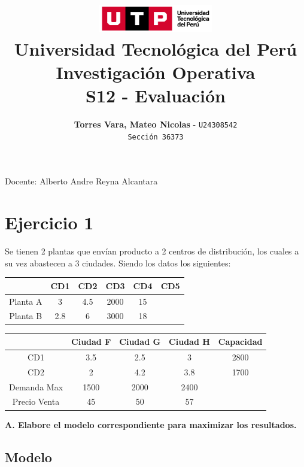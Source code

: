 \documentclass[12pt]{article}
\title{
  \vspace{2cm}
  \pagenumbering{gobble}
  \includegraphics[width=5cm]{../assets/logo-utp.png} \\
  \vspace{1cm}
  \textbf{Universidad Tecnológica del Perú} \\
  \vspace{2cm}
  \textbf{Investigación Operativa} \\
  \vspace{1cm}
  \large \textbf{S12 - Evaluación}
}
\author{
  \textbf{Torres Vara, Mateo Nicolas} - \texttt{U24308542} \\
  \texttt{Sección 36373}
}
\begin{document}
\maketitle
\begin{center}

  Docente: Alberto Andre Reyna Alcantara

\end{center}

%
%

\newpage
\section*{Ejercicio 1}

\noindent Se tienen 2 plantas que envían producto a 2 centros de distribución, 
los cuales a su vez abastecen a 3 ciudades.
Siendo los datos los siguientes:

\begin{center}
  \begin{tabular}{|c|c|c|c|c|c|}
    \hline
    & CD1 & CD2 & CD3 & CD4 & CD5 \\
    \hline
    Planta A & 3 & 4.5 & 2000 & 15 &  \\
    \hline
    Planta B & 2.8 & 6 & 3000 & 18 &  \\
    \hline
  \end{tabular}
\end{center}

\begin{center}
  \begin{tabular}{|c|c|c|c|c|}
    \hline
    & Ciudad F & Ciudad G & Ciudad H & Capacidad \\
    \hline
    CD1 & 3.5 & 2.5 & 3 & 2800 \\
    \hline
    CD2 & 2 & 4.2 & 3.8 & 1700 \\
    \hline
    Demanda Max & 1500 & 2000 & 2400 & \\
    \hline
    Precio Venta & 45 & 50 & 57 &  \\
    \hline 
  \end{tabular}
\end{center}


\textbf{A. Elabore el modelo correspondiente para maximizar los resultados.}

\vspace{2cm}

\subsection*{Modelo}
\end{document}

